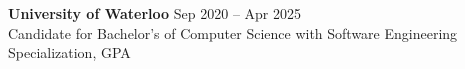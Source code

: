 \documentclass[10pt]{developercv} %
\begin{document}
\vspace{0.3cm}









\begin{minipage}[t]{\textwidth}
	\vspace{-\baselineskip}
	\textbf{University of Waterloo} \hfill Sep 2020 -- Apr 2025 \\
	Candidate for Bachelor's of Computer Science with Software Engineering Specialization,  GPA
\end{minipage}


\end{document}
